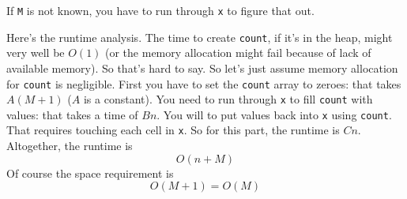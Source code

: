 If \verb!M! is not 
known, you have to run through \verb!x! to figure that out.


Here's the runtime analysis.
The time to create \verb!count!, if it's in the heap,
might very well be $O(1)$ (or the memory allocation might fail because of lack of
available memory). So that's hard to say.
So let's just assume memory allocation for \verb!count! is negligible.
First you have to set the \verb!count! array to zeroes:
that takes $A(M + 1)$ ($A$ is a constant).
You need to run through \verb!x! to fill \verb!count! with
values: that takes a time of $Bn$.
You will to put values back into \verb!x! using \verb!count!.
That requires touching each cell in \verb!x!.
So for this part, the runtime is $Cn$.
Altogether, the runtime is
\[
O(n + M)
\]
Of course the space requirement is
\[
O(M + 1) = O(M)
\]








